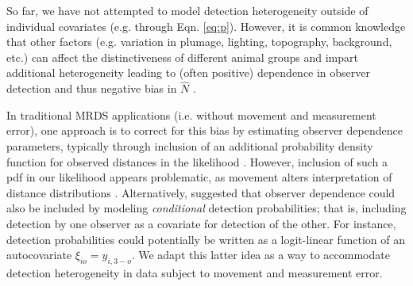 \documentclass[aoas,preprint]{imsart}
\numberwithin{equation}{section}
\theoremstyle{plain}
\begin{document}
So far, we have not attempted to model detection heterogeneity outside of individual covariates (e.g. through Eqn. \ref{eq:p}).  However, it is common knowledge that other factors (e.g. variation in plumage, lighting, topography, background, etc.) can affect the distinctiveness of different animal groups and impart additional heterogeneity leading to (often positive) dependence in observer detection and thus negative bias in $\hat{N}$ \citep{LaakeBorchers2004,BucklandEtAl2010,BurtEtAl2014}.

In traditional MRDS applications (i.e. without movement and measurement error), one approach is to correct for this bias by estimating observer dependence parameters, typically through inclusion of an additional probability density function for observed distances in the likelihood \citep[cf.][]{BucklandEtAl2010}.  However, inclusion of such a pdf in our likelihood appears problematic, as movement alters interpretation of distance distributions \citep{BurtEtAl2014}.  Alternatively, \citet{MacKenzieClement2016} suggested that observer dependence could also be included by modeling \textit{conditional} detection probabilities; that is, including detection by one observer as a covariate for detection of the other.  For instance, detection probabilities could potentially be written as a logit-linear function of an autocovariate $\xi_{io} = y_{i,3-o}$.  We adapt this latter idea as a way to accommodate detection heterogeneity in data subject to movement and measurement error.
\end{document}
